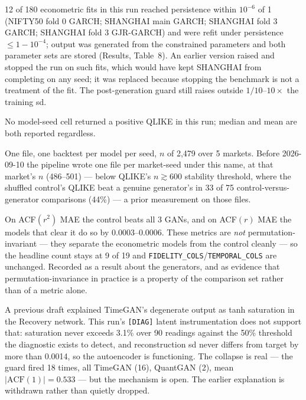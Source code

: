 \documentclass[10pt]{article}
\newcommand{\auditrow}[5]{%
  \begin{tcolorbox}[mybox={#2}{#3},
    title={\textbf{[#1]}\quad #4},
    before skip=4pt, after skip=4pt, breakable]
  \small #5
  \end{tcolorbox}}
\begin{document}
\auditrow{FIXED}{Amber}{ABg}%
  {GARCH fits at the integrated boundary: two-stage fitting}%
  {12 of 180 econometric fits in this run reached persistence within $10^{-6}$ of 1 (NIFTY50 fold 0 GARCH; SHANGHAI main GARCH; SHANGHAI fold 3 GARCH; SHANGHAI fold 3 GJR-GARCH) and were refit under persistence $\le1-10^{-4}$; output was generated from the constrained parameters and both parameter sets are stored (Results, Table~8). An earlier version raised and stopped the run on such fits, which would have kept SHANGHAI from completing on any seed; it was replaced because stopping the benchmark is not a treatment of the fit. The post-generation guard still raises outside $1/10$--$10\times$ the training sd.}

\auditrow{OK}{FGreen}{GBg}%
  {Downstream QLIKE: no degenerate cells}%
  {No model-seed cell returned a positive QLIKE in this run; median and mean are both reported regardless.}

\auditrow{FIXED}{Amber}{ABg}%
  {Downstream utility pooled across markets}%
  {One file, one backtest per model per seed, $n$ of 2,479 over 5 markets. Before 2026-09-10 the pipeline wrote one file per market-seed under this name, at that market's $n$ (486--501) --- below QLIKE's $n\gtrsim600$ stability threshold, where the shuffled control's QLIKE beat a genuine generator's in 33 of 75 control-versus-generator comparisons (44\%) --- a prior measurement on those files.}

\auditrow{OPEN}{Indigo}{IBg}%
  {Shuffled control outperforms genuine GANs on ordering-sensitive metrics}%
  {On ACF$(r^2)$ MAE the control beats all 3 GANs, and on ACF$(r)$ MAE the models that clear it do so by 0.0003--0.0006. These metrics are \emph{not} permutation-invariant --- they separate the econometric models from the control cleanly --- so the headline count stays at 9 of 19 and \texttt{FIDELITY\_COLS}/\texttt{TEMPORAL\_COLS} are unchanged. Recorded as a result about the generators, and as evidence that permutation-invariance in practice is a property of the comparison set rather than of a metric alone.}

\auditrow{WITHDRAWN}{Amber}{ABg}%
  {Earlier attribution of TimeGAN's collapse to tanh saturation}%
  {A previous draft explained TimeGAN's degenerate output as tanh saturation in the Recovery network. This run's \texttt{[DIAG]} latent instrumentation does not support that: saturation never exceeds 3.1\% over 90 readings against the 50\% threshold the diagnostic exists to detect, and reconstruction sd never differs from target by more than 0.0014, so the autoencoder is functioning. The collapse is real --- the guard fired 18 times, all TimeGAN (16), QuantGAN (2), mean $|\text{ACF}(1)| = 0.533$ --- but the mechanism is open. The earlier explanation is withdrawn rather than quietly dropped.}
\end{document}
